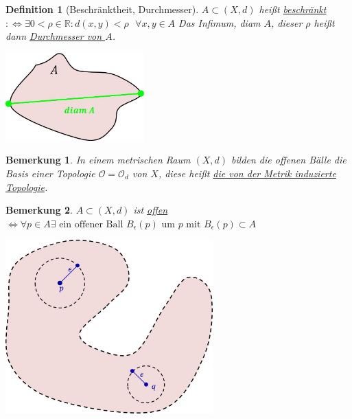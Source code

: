 \documentclass[a4paper,11pt,notitlepage]{report}
\newtheorem{definition}{Definition}[chapter]
\newtheorem{remark}{Bemerkung}[chapter]
\newcommand{\R}{{\ensuremath{\mathbb{R}}}}
\newcommand{\OO}{{\ensuremath{\mathcal{O}}}}
\begin{document}
\begin{definition}[Beschränktheit, Durchmesser]
	$A \subset (X,d)$ heißt \underline{beschränkt} \newline $:\Leftrightarrow \exists 0 < \rho \in \R \colon d(x,y) < \rho  \text{   } \forall x,y \in A$
	\newline
	Das Infimum, diam $A$, dieser $\rho$ heißt dann \underline{Durchmesser von $A$}.
	\newline
	\begin{center}
	\includegraphics[width=0.4\textwidth]{images/Durchmesser.jpg}
	\end{center}
\end{definition}
	
\begin{remark}
	In einem metrischen Raum $(X,d)$ bilden die offenen Bälle die Basis einer Topologie $\OO=\OO_d$ von $X$, diese heißt \underline{die von der Metrik induzierte Topologie}.
\end{remark}

\begin{remark}
	$A \subset (X,d)$ ist \underline{offen}
	\newline
	$\Leftrightarrow \forall p \in A \exists \text{ ein offener Ball } B_\epsilon(p) \text{ um } p \text{ mit } B_\epsilon(p) \subset A$
	\newline
	\begin{center}
	\includegraphics[width=0.6\textwidth]{images/metrisch_offen.jpg}
	\end{center}
\end{remark}
\end{document}
